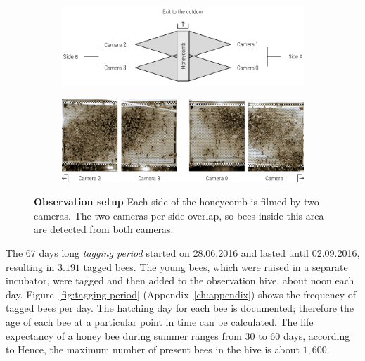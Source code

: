 \begin{figure}
    \centering
    \begin{subfigure}[htb]{\textwidth}
	\centering
	\includegraphics[width=1.0\textwidth]{Figures/setupCams}
	\vspace{0mm}
    \end{subfigure}
    \begin{subfigure}[b]{\textwidth}
	\centering
	\includegraphics[width=1.0\textwidth]{Figures/beesClose}
    \end{subfigure}
    \vspace{0mm}
 	\caption[Observation setup]{\textbf{Observation setup} Each side of the honeycomb is filmed by two cameras. The two cameras per side overlap, so bees inside this area are detected from both cameras.}
 	\label{fig:obssetup}
\end{figure}

The 67 days long \emph{tagging period} started on 28.06.2016 and lasted until 02.09.2016, resulting in $3.191$ tagged bees. The young bees, which were raised in a separate incubator, were tagged and then added to the observation hive, about noon each day.
Figure~\ref{fig:tagging-period} (Appendix~\ref{ch:appendix}) shows the frequency of tagged bees per day. The hatching day for each bee is documented; therefore the age of each bee at a particular point in time can be calculated.
The life expectancy of a honey bee during summer ranges from 30 to 60 days, according to \textcite[p. 27]{menzel2016intelligenz}
Hence, the maximum number of present bees in the hive is about $1,600$.

